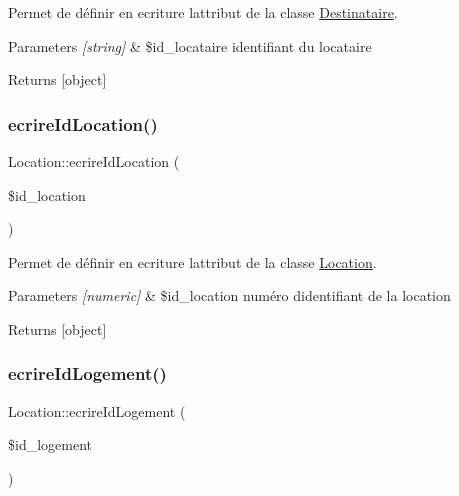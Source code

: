 Permet de définir en ecriture l\textquotesingle{}attribut de la classe \hyperlink{class_destinataire}{Destinataire}. 


\begin{DoxyParams}{Parameters}
{\em \mbox{[}string\mbox{]}} & \$id\+\_\+locataire identifiant du locataire \\
\hline
\end{DoxyParams}
\begin{DoxyReturn}{Returns}
\mbox{[}object\mbox{]} 
\end{DoxyReturn}
\mbox{\label{class_location_a6ac3b0f3c8791cc6d7aca434d5e0e007}} 
\subsubsection{\texorpdfstring{ecrire\+Id\+Location()}{ecrireIdLocation()}}
{\footnotesize\ttfamily Location\+::ecrire\+Id\+Location (\begin{DoxyParamCaption}\item[{}]{\$id\+\_\+location }\end{DoxyParamCaption})}



Permet de définir en ecriture l\textquotesingle{}attribut de la classe \hyperlink{class_location}{Location}. 


\begin{DoxyParams}{Parameters}
{\em \mbox{[}numeric\mbox{]}} & \$id\+\_\+location numéro d\textquotesingle{}identifiant de la location \\
\hline
\end{DoxyParams}
\begin{DoxyReturn}{Returns}
\mbox{[}object\mbox{]} 
\end{DoxyReturn}
\mbox{\label{class_location_a1972513b78fac42cde85148c7c8af005}} 
\subsubsection{\texorpdfstring{ecrire\+Id\+Logement()}{ecrireIdLogement()}}
{\footnotesize\ttfamily Location\+::ecrire\+Id\+Logement (\begin{DoxyParamCaption}\item[{}]{\$id\+\_\+logement }\end{DoxyParamCaption})}



